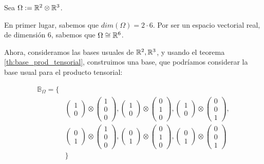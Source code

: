 \begin{ejemplo}
    Sea $\Omega := \mathbb{R}^2 \otimes \mathbb{R}^3$.

    En primer lugar, sabemos que $dim(\Omega) = 2 \cdot 6$. Por ser un espacio vectorial real, de dimensión $6$, sabemos que $\Omega \cong \mathbb{R}^6$.

    Ahora, consideramos las bases usuales de $\mathbb{R}^2, \mathbb{R}^3$, y usando el teorema \ref{th:base_prod_tensorial}, construimos una base, que podríamos considerar la base usual para el producto tensorial:

    \begin{equation}
    \begin{split}
    \mathbb{B}_{\Omega} = \{& \\
        & \begin{pmatrix}1 \\ 0 \end{pmatrix} \otimes \begin{pmatrix} 1 \\ 0 \\ 0 \end{pmatrix},
        \begin{pmatrix}1 \\ 0 \end{pmatrix} \otimes \begin{pmatrix} 0 \\ 1 \\ 0 \end{pmatrix},
        \begin{pmatrix}1 \\ 0 \end{pmatrix} \otimes \begin{pmatrix} 0 \\ 0 \\ 1 \end{pmatrix}, \\
        & \begin{pmatrix}0 \\ 1 \end{pmatrix} \otimes \begin{pmatrix} 1 \\ 0 \\ 0 \end{pmatrix},
        \begin{pmatrix}0 \\ 1 \end{pmatrix} \otimes \begin{pmatrix} 0 \\ 1 \\ 0 \end{pmatrix},
        \begin{pmatrix}0 \\ 1 \end{pmatrix} \otimes \begin{pmatrix} 0 \\ 0 \\ 1 \end{pmatrix} \\
    & \}
    \end{split}
    \end{equation}


\end{ejemplo}
